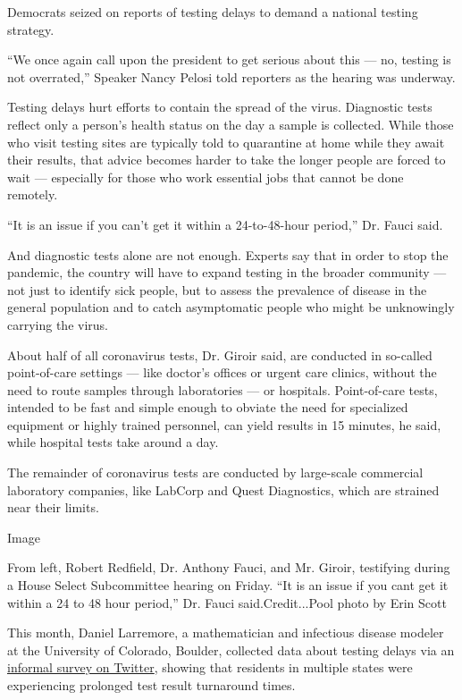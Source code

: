 Democrats seized on reports of testing delays to demand a national
testing strategy.

``We once again call upon the president to get serious about this ---
no, testing is not overrated,'' Speaker Nancy Pelosi told reporters as
the hearing was underway.

Testing delays hurt efforts to contain the spread of the virus.
Diagnostic tests reflect only a person's health status on the day a
sample is collected. While those who visit testing sites are typically
told to quarantine at home while they await their results, that advice
becomes harder to take the longer people are forced to wait ---
especially for those who work essential jobs that cannot be done
remotely.

``It is an issue if you can't get it within a 24-to-48-hour period,''
Dr. Fauci said.

And diagnostic tests alone are not enough. Experts say that in order to
stop the pandemic, the country will have to expand testing in the
broader community --- not just to identify sick people, but to assess
the prevalence of disease in the general population and to catch
asymptomatic people who might be unknowingly carrying the virus.

About half of all coronavirus tests, Dr. Giroir said, are conducted in
so-called point-of-care settings --- like doctor's offices or urgent
care clinics, without the need to route samples through laboratories ---
or hospitals. Point-of-care tests, intended to be fast and simple enough
to obviate the need for specialized equipment or highly trained
personnel, can yield results in 15 minutes, he said, while hospital
tests take around a day.

The remainder of coronavirus tests are conducted by large-scale
commercial laboratory companies, like LabCorp and Quest Diagnostics,
which are strained near their limits.

Image

From left, Robert Redfield, Dr. Anthony Fauci, and Mr. Giroir,
testifying during a House Select Subcommittee hearing on Friday. ``It is
an issue if you cant get it within a 24 to 48 hour period,'' Dr. Fauci
said.Credit...Pool photo by Erin Scott

This month, Daniel Larremore, a mathematician and infectious disease
modeler at the University of Colorado, Boulder, collected data about
testing delays via an
\href{https://larremorelab.github.io/covid19testgroup}{informal survey
on Twitter}, showing that residents in multiple states were experiencing
prolonged test result turnaround times.

